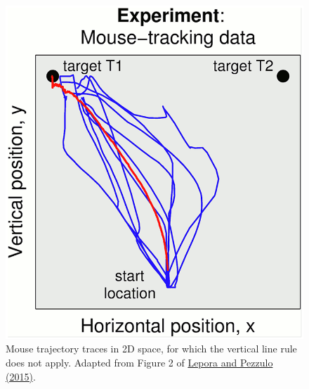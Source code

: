 \documentclass[letterpaper, 12pt]{article}
\begin{document}
\begin{figure}[h!tbp]
    \centering
    \includegraphics[width=\textwidth]{img/vertical_line/pcbi.1004110.g002.png}
    \caption*{Mouse trajectory traces in 2D space, for which the vertical line rule does not apply. Adapted from Figure 2 of \href{https://doi.org/10.1371/journal.pcbi.1004110}{Lepora and Pezzulo (2015)}.}
\end{figure}
\end{document}
